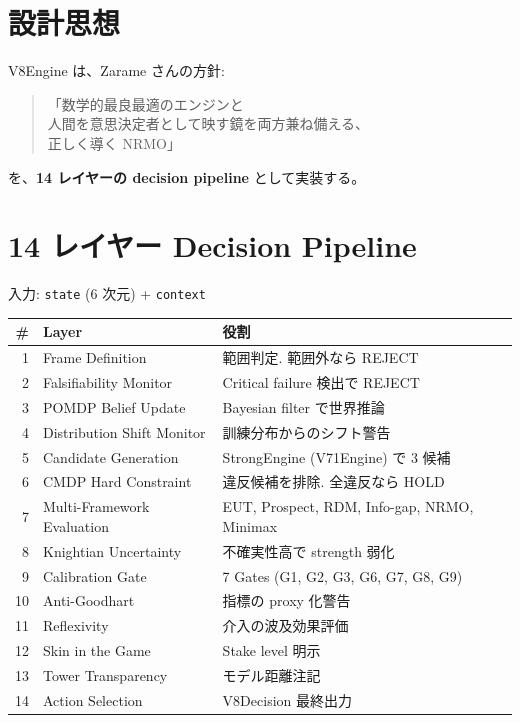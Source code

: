 \documentclass[a4paper,11pt]{report}
\begin{document}
\section{設計思想}

V8Engine は、Zarame さんの方針:

\begin{quote}
「数学的最良最適のエンジンと\\
人間を意思決定者として映す鏡を両方兼ね備える、\\
正しく導く NRMO」
\end{quote}

を、\textbf{14 レイヤーの decision pipeline} として実装する。

\section{14 レイヤー Decision Pipeline}

入力: \texttt{state} (6 次元) + \texttt{context}

\begin{longtable}{r p{4.5cm} p{6.5cm}}
\toprule
\# & Layer & 役割 \\
\midrule
1 & Frame Definition & 範囲判定. 範囲外なら REJECT \\
2 & Falsifiability Monitor & Critical failure 検出で REJECT \\
3 & POMDP Belief Update & Bayesian filter で世界推論 \\
4 & Distribution Shift Monitor & 訓練分布からのシフト警告 \\
5 & Candidate Generation & StrongEngine (V71Engine) で 3 候補 \\
6 & CMDP Hard Constraint & 違反候補を排除. 全違反なら HOLD \\
7 & Multi-Framework Evaluation & EUT, Prospect, RDM, Info-gap, NRMO, Minimax \\
8 & Knightian Uncertainty & 不確実性高で strength 弱化 \\
9 & Calibration Gate & 7 Gates (G1, G2, G3, G6, G7, G8, G9) \\
10 & Anti-Goodhart & 指標の proxy 化警告 \\
11 & Reflexivity & 介入の波及効果評価 \\
12 & Skin in the Game & Stake level 明示 \\
13 & Tower Transparency & モデル距離注記 \\
14 & Action Selection & V8Decision 最終出力 \\
\bottomrule
\end{longtable}
\end{document}
